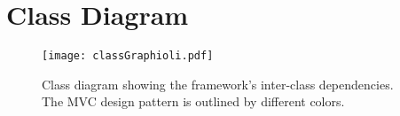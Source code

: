 \section{Class Diagram}

\begin{figure}[h]
	\centering
	\texttt{[image: classGraphioli.pdf]}
	\caption{Class diagram showing the framework's inter-class dependencies. The MVC design pattern is outlined by different colors.}
	\label{img:classGraphioli}
\end{figure}